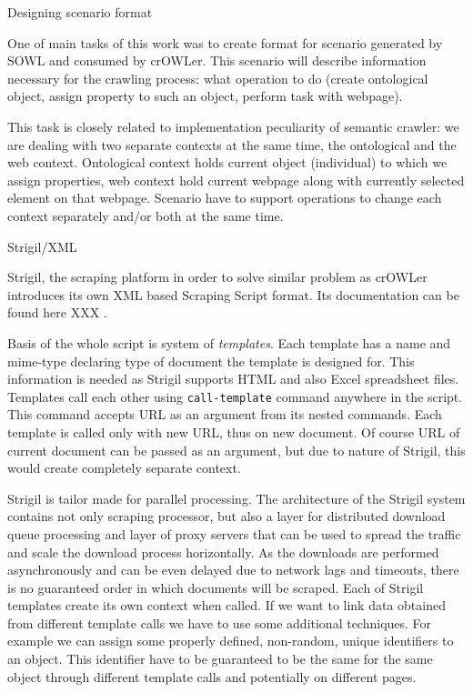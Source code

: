 \sec Designing scenario format

One of main tasks of this work was to create format for scenario generated by
SOWL and consumed by crOWLer. This scenario will describe information necessary
for the crawling process: what operation to do (create ontological object,
assign property to such an object, perform task with webpage). 

This task is closely related to implementation peculiarity of semantic crawler:
we are dealing with two separate contexts at the same time, the ontological and
the web context. Ontological context holds current object (individual) to which
we assign properties, web context hold current webpage along with currently
selected element on that webpage. Scenario have to support operations to change
each context separately and/or both at the same time. 



\secc Strigil/XML

Strigil, the scraping platform in order to solve similar problem as crOWLer
introduces its own XML based Scraping Script format. Its documentation can be
found here XXX
. 

Basis of the whole script is system of {\em templates}. Each template has a name
and mime-type declaring type of document the template is designed for. This
information is needed as Strigil supports HTML and also Excel spreadsheet
files. Templates call each other using {\tt call-template} command anywhere in
the script. This command accepts URL as an argument from its nested commands.
Each template is called only with new URL, thus on new document. Of course URL
of current document can be passed as an argument, but due to nature of Strigil,
this would create completely separate context. 

Strigil is tailor made for parallel processing. The architecture of the Strigil
system contains not only scraping processor, but also a layer for distributed
download queue processing and layer of proxy servers that can be used to spread
the traffic and scale the download process horizontally. As the downloads are
performed asynchronously and can be even delayed due to network lags and
timeouts, there is no guaranteed order in which documents will be scraped.
Each of Strigil templates create its own context when called. If we want to
link data obtained from different template calls we have to use some additional
techniques. For example we can assign some properly defined, non-random, unique
identifiers to an object. This identifier have to be guaranteed to be the same
for the same object through different template calls and potentially on
different pages. 

